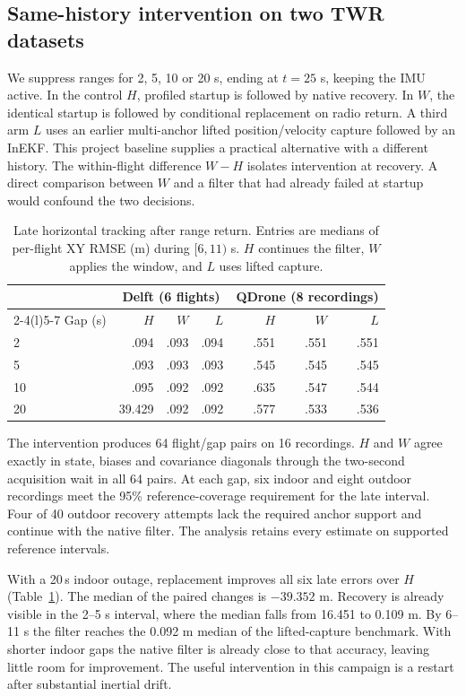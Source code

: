 \documentclass{IEEEtaes}
\begin{document}
\subsection{Same-history intervention on two TWR datasets}
We suppress ranges for 2, 5, 10 or 20 s, ending at \(t=25\) s, keeping the IMU active. In the control \(H\), profiled startup is followed by native recovery. In \(W\), the identical startup is followed by conditional replacement on radio return. A third arm \(L\) uses an earlier multi-anchor lifted position/velocity capture followed by an InEKF. This project baseline supplies a practical alternative with a different history. The within-flight difference \(W-H\) isolates intervention at recovery. A direct comparison between \(W\) and a filter that had already failed at startup would confound the two decisions.

\begin{table}[t]
\caption{Late horizontal tracking after range return. Entries are medians of per-flight XY RMSE (m) during \([6,11)\) s. \(H\) continues the filter, \(W\) applies the window, and \(L\) uses lifted capture.}
\label{tab:loop}\centering\tablefont
\begin{tabular}{@{}lrrrrrr@{}}
\toprule
&\multicolumn{3}{c}{Delft (6 flights)}&\multicolumn{3}{c}{QDrone (8 recordings)}\\
\cmidrule(lr){2-4}\cmidrule(l){5-7}
Gap (s)&\(H\)&\(W\)&\(L\)&\(H\)&\(W\)&\(L\)\\\midrule
2&.094&.093&.094&.551&.551&.551\\
5&.093&.093&.093&.545&.545&.545\\
10&.095&.092&.092&.635&.547&.544\\
20&39.429&.092&.092&.577&.533&.536\\
\bottomrule
\end{tabular}
\end{table}

The intervention produces 64 flight/gap pairs on 16 recordings. \(H\) and \(W\) agree exactly in state, biases and covariance diagonals through the two-second acquisition wait in all 64 pairs. At each gap, six indoor and eight outdoor recordings meet the 95\% reference-coverage requirement for the late interval. Four of 40 outdoor recovery attempts lack the required anchor support and continue with the native filter. The analysis retains every estimate on supported reference intervals.

With a 20\,s indoor outage, replacement improves all six late errors over \(H\) (Table~\ref{tab:loop}). The median of the paired changes is \(-39.352\) m. Recovery is already visible in the 2--5 s interval, where the median falls from 16.451 to 0.109 m. By 6--11 s the filter reaches the 0.092 m median of the lifted-capture benchmark. With shorter indoor gaps the native filter is already close to that accuracy, leaving little room for improvement. The useful intervention in this campaign is a restart after substantial inertial drift.
\end{document}
